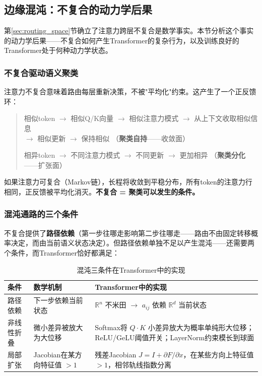 \documentclass[11pt,a4paper]{article}
\theoremstyle{definition}
\begin{document}
\subsection{边缘混沌：不复合的动力学后果}
\label{sec:edge_chaos}

第\ref{sec:routing_space}节确立了注意力跨层不复合是数学事实。本节分析这个事实的动力学后果——不复合如何产生Transformer的复杂行为，以及训练良好的Transformer处于何种动力学状态。

\subsubsection{不复合驱动语义聚类}

注意力不复合意味着路由每层重新决策，不被"平均化"约束。这产生了一个正反馈环：

\begin{quote}
相似token $\to$ 相似Q/K向量 $\to$ 相似注意力模式 $\to$ 从上下文收取相似信息 \\
$\to$ 相似更新 $\to$ 保持相似 \quad （\textbf{聚类自持}——收敛面）

相异token $\to$ 不同注意力模式 $\to$ 不同更新 $\to$ 更加相异 \quad （\textbf{聚类分化}——扩张面）
\end{quote}

如果注意力可复合（Markov链），长程将收敛到平稳分布，所有token的注意力行相同，正反馈被平均化消灭。\textbf{不复合 = 聚类可以发生的条件。}

\subsubsection{混沌通路的三个条件}

不复合提供了\textbf{路径依赖}（第一步往哪走影响第二步往哪走——路由不由固定转移概率决定，而由当前语义状态决定）。但路径依赖单独不足以产生混沌——还需要两个条件，而Transformer恰好都满足：

\begin{table}[H]
\centering
\caption{混沌三条件在Transformer中的实现}
\begin{tabular}{@{}p{2.5cm}p{5cm}p{5cm}@{}}
\toprule
\textbf{条件} & \textbf{数学机制} & \textbf{Transformer中的实现} \\
\midrule
路径依赖 & 下一步依赖当前状态 & $\mathbb{R}^n$ 不米田 $\to$ $a_{ij}$ 依赖 $\mathbb{R}^d$ 当前状态 \\
非线性折叠 & 微小差异被放大为大位移 & Softmax将 $Q \cdot K$ 小差异放大为概率单纯形大位移；ReLU/GeLU阈值开关；LayerNorm约束模长到球面 \\
局部扩张 & Jacobian在某方向特征值 $> 1$ & 残差Jacobian $J = I + \partial F/\partial x$，在某些方向上特征值 $> 1$，相邻轨线指数分离 \\
\bottomrule
\end{tabular}
\end{table}
\end{document}
